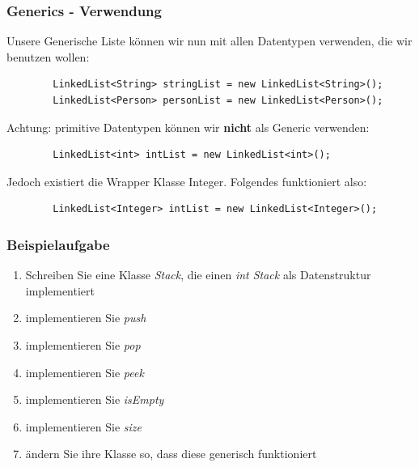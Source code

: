 \begin{frame}[fragile]
\frametitle{Generics - Verwendung}
    Unsere Generische Liste können wir nun mit allen Datentypen verwenden, die wir benutzen wollen:
    \begin{lstlisting}
        LinkedList<String> stringList = new LinkedList<String>();
        LinkedList<Person> personList = new LinkedList<Person>();
    \end{lstlisting}
    Achtung: primitive Datentypen können wir \textbf{nicht} als Generic verwenden:
    \begin{lstlisting}
        LinkedList<int> intList = new LinkedList<int>();
    \end{lstlisting}
    Jedoch existiert die Wrapper Klasse Integer. Folgendes funktioniert also:
    \begin{lstlisting}
        LinkedList<Integer> intList = new LinkedList<Integer>();
    \end{lstlisting}
\end{frame}

\begin{frame}[fragile]
\frametitle{Beispielaufgabe}
\begin{enumerate}
    \item Schreiben Sie eine Klasse \textit{Stack}, die einen \textit{int Stack} als Datenstruktur implementiert
    \item implementieren Sie \textit{push}
    \item implementieren Sie \textit{pop}
    \item implementieren Sie \textit{peek}
    \item implementieren Sie \textit{isEmpty}
    \item implementieren Sie \textit{size}
    \item ändern Sie ihre Klasse so, dass diese generisch funktioniert
\end{enumerate}
\end{frame}